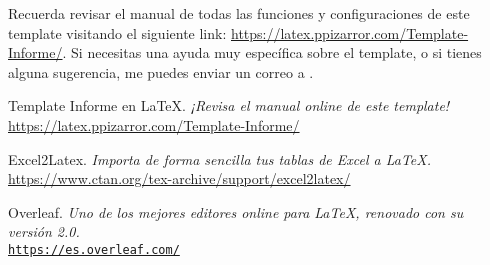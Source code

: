 		Recuerda revisar el manual de todas las funciones y configuraciones de este template visitando el siguiente link: \url{https://latex.ppizarror.com/Template-Informe/}. Si necesitas una ayuda muy específica sobre el template, o si tienes alguna sugerencia, me puedes enviar un correo a .


\newpage %
\begin{references}
	Template Informe en \LaTeX.
	\textit{¡Revisa el manual online de este template!} \\
	\url{https://latex.ppizarror.com/Template-Informe/}

	Excel2Latex.
	\textit{Importa de forma sencilla tus tablas de Excel a \LaTeX.} \\
	\url{https://www.ctan.org/tex-archive/support/excel2latex/}

	Overleaf.
	\textit{Uno de los mejores editores online para \LaTeX, renovado con su versión 2.0.} \\
	\href{https://es.overleaf.com}{\texttt{https://es.overleaf.com/}}
\end{references}


